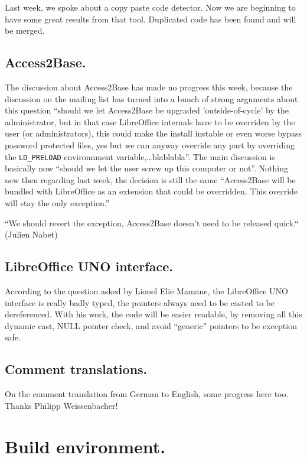 \documentclass{article}
\begin{document}
Last week, we spoke about a copy paste code detector. Now we are beginning to have some great results from that tool. Duplicated code has been found and will be merged\cite{duplicateFound}.

\subsection{Access2Base.}

The discussion about Access2Base has made no progress this week, because the discussion on the mailing list has turned into a bunch of strong arguments about this question ``should we let Access2Base be upgraded 'outside-of-cycle' by the administrator, but in that case LibreOffice internals have to be overriden by the user (or administrators), this could make the install instable or even worse bypass password protected files, yes but we can anyway override any part by overriding the \lstinline|LD_PRELOAD| environnment variable,\ldots blablabla''. The main discussion is basically now ``should we let the user screw up this computer or not''. Nothing new then regarding last week, the decision is still the same ``Access2Base will be bundled with LibreOffice as an extension that could be overridden. This override will stay the only exception.''

``We should revert the exception, Access2Base doesn't need to be released quick.`` (Julien Nabet)

\subsection{LibreOffice UNO interface.}

According to the question asked by Lionel Elie Mamane, the LibreOffice UNO interface is really badly typed, the pointers always need to be casted to be dereferenced. With his work, the code will be easier readable, by removing all this dynamic cast, NULL pointer check, and avoid ``generic'' pointers to be exception safe\cite{unoTypeRefactor}.

\subsection{Comment translations.}

On the comment translation from German to English, some progress\cite{german1,german2} here too. Thanks Philipp Weissenbacher!



\section{Build environment.}
\end{document}
